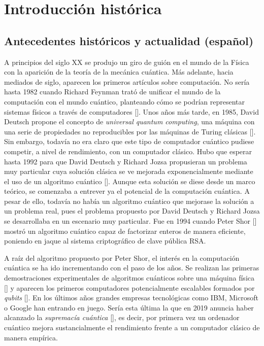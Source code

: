 \chapter{Introducción histórica}

\section{Antecedentes históricos y actualidad (español)}
A principios del siglo XX se produjo un giro de guión en el mundo de la Física con la aparición de la teoría de la mecánica cuántica. Más adelante, hacia mediados de siglo, aparecen los primeros artículos sobre computación. No sería hasta 1982 cuando Richard Feynman trató de unificar el mundo de la computación con el mundo cuántico, planteando cómo se podrían representar sistemas físicos a través de computadores [\cite{feynman1982simulating}].
%
Unos años más tarde, en 1985, David Deutsch propone el concepto de \textit{universal quantum computing}, una máquina con una serie de propiedades no reproducibles por las máquinas de Turing clásicas [\cite{deutsch1985quantum}].
%
Sin embargo, todavía no era claro que este tipo de computador cuántico pudiese competir, a nivel de rendimiento, con un computador clásico. Hubo que esperar hasta 1992 para que David Deutsch y Richard Jozsa propusieran un problema muy particular cuya solución clásica se ve mejorada exponencialmente mediante el uso de un algoritmo cuántico [\cite{deutsch1992rapid}]. Aunque esta solución se diese desde un marco teórico, se comenzaba a entrever ya el potencial de la computación cuántica.
%
A pesar de ello, todavía no había un algoritmo cuántico que mejorase la solución a un problema real, pues el problema propuesto por David Deutsch y Richard Jozsa se desarrollaba en un escenario muy particular. Fue en 1994 cuando Peter Shor [\cite{shor1994algorithms}] mostró un algoritmo cuántico capaz de factorizar enteros de manera eficiente, poniendo en jaque al sistema criptográfico de clave pública RSA.
%

A raíz del algoritmo propuesto por Peter Shor, el interés en la computación cuántica se ha ido incrementando con el paso de los años. Se realizan las primeras demostraciones experimentales de algoritmos cuánticos sobre una máquina física [\cite{jones1998implementation}] y aparecen los primeros computadores potencialmente escalables formados por \textit{qubits} [\cite{haffner2005scalable}].
%
En los últimos años grandes empresas tecnológicas como IBM, Microsoft o Google han entrando en juego. Sería esta última la que en 2019 anuncia haber alcanzado la \textit{supremacía cuántica} [\cite{arute2019quantum}], es decir, por primera vez un ordenador cuántico mejora sustancialmente el rendimiento frente a un computador clásico de manera empírica.

